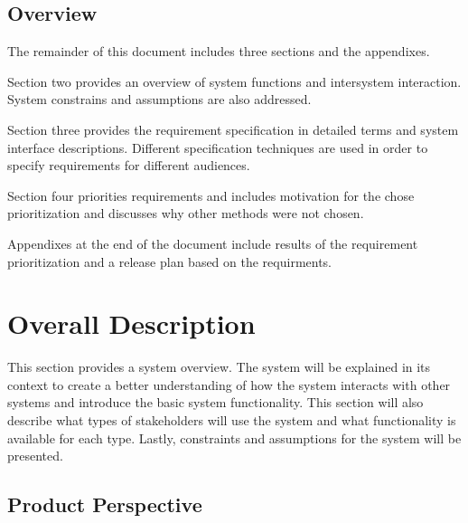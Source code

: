 \documentclass[draftclsnofoot,onecolumn,10pt]{IEEEtran}
\begin{document}
\subsection{Overview} %
The remainder of this document includes three sections and the appendixes. \par
Section two provides an overview of system functions and intersystem interaction. 
System constrains and assumptions are also addressed. \par
Section three provides the requirement specification in detailed terms and system 
interface descriptions. Different specification techniques are used in order to specify 
requirements for different audiences. \par
Section four priorities requirements and includes motivation for the chose prioritization 
and discusses why other methods were not chosen. \par
Appendixes at the end of the document include results of the requirement prioritization 
and a release plan based on the requirments.

\section{Overall Description} %
This section provides a system overview. The system will be explained in its context to 
create a better understanding of how the system interacts with other systems and 
introduce the basic system functionality. This section will also describe what types of 
stakeholders will use the system and what functionality is available for each type. 
Lastly, constraints and assumptions for the system will be presented. 


\subsection{Product Perspective} %
\end{document}
